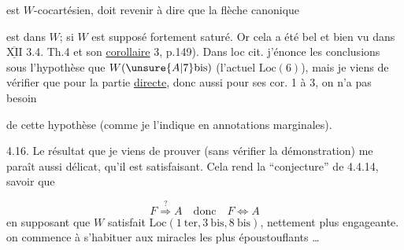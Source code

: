 est $W$-cocartésien, doit revenir à dire que la flèche canonique

est dans $W$;   si $W$ est supposé fortement saturé. Or cela a été bel et bien vu dans $\underline{\overline{\mathrm{XII}}}$ 3.4. Th.4 et son \uline{corollaire} 3, p.149). Dans loc cit. j'énonce les conclusions sous l'hypothèse que  $W(\unsure{A|7}\mathrm{bis})$ (l'actuel $\mathrm{Loc}(6)$), mais je viens de vérifier que pour la partie \uline{directe}, donc aussi pour ses cor. 1 à 3, on n'a pas besoin

de cette hypothèse (comme je l'indique en annotations marginales).

4.16. Le résultat que je viens de prouver (sans vérifier  la démonstration) me paraît aussi délicat, qu'il est satisfaisant. Cela  rend la ``conjecture''  de 4.4.14, savoir que

\[
 F\overset{?}{\Rightarrow}A\quad\text{donc}\quad F\Leftrightarrow A
\]
en supposant que $W$ satisfait $\mathrm{Loc}(1\ \mathrm{ter},3\ \mathrm{bis},8\ \mathrm{bis})$, nettement plus engageante.  on commence à s'habituer aux miracles les plus époustouflants \ldots


